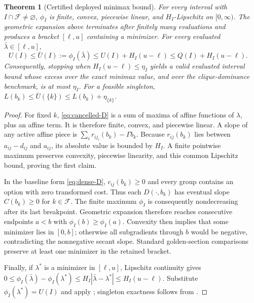 \documentclass[11pt]{article}
\theoremstyle{plain}
\newtheorem{theorem}{Theorem}
\theoremstyle{definition}
\theoremstyle{remark}
\begin{document}
\begin{theorem}[Certified deployed minimax bound]\label{thm:certified-minimax}
For every interval with $I\cap\mathcal F\ne\varnothing$, $\phi_I$ is finite, convex, piecewise linear, and $H_I$-Lipschitz on $[0,\infty)$.  The geometric expansion above terminates after finitely many evaluations and produces a bracket $[\ell,u]$ containing a minimizer.  For every evaluated $\bar\lambda\in[\ell,u]$,
\begin{equation}\label{eq:certified-gap}
U(I)\le \bar U(I):=\phi_I(\bar\lambda)
\le U(I)+H_I(u-\ell)\le Q(I)+H_I(u-\ell).
\end{equation}
Consequently, stopping when $H_I(u-\ell)\le\eta_I$ yields a valid evaluated interval bound whose excess over the exact minimax value, and over the clique-dominance benchmark, is at most $\eta_I$.  For a feasible singleton, $L(b_k)\le\bar U(\{k\})\le L(b_k)+\eta_{\{k\}}$.
\end{theorem}
\begin{proof}
For fixed $k$, \eqref{eq:cancelled-D} is a sum of maxima of affine functions of $\lambda$, plus an affine term.  It is therefore finite, convex, and piecewise linear.  A slope of any active affine piece is
$\sum_i r_{ij_i}(b_k)-\Gamma b_k$.  Because $r_{ij}(b_k)$ lies between $a_{ij}-d_{ij}$ and $a_{ij}$, its absolute value is bounded by $H_I$.  A finite pointwise maximum preserves convexity, piecewise linearity, and this common Lipschitz bound, proving the first claim.

In the baseline form \eqref{eq:dense-D}, $c_{ij}(b_k)\ge0$ and every group contains an option with zero transformed cost.  Thus each $D(\cdot,b_k)$ has eventual slope $C(b_k)\ge0$ for $k\in\mathcal F$.  The finite maximum $\phi_I$ is consequently nondecreasing after its last breakpoint.  Geometric expansion therefore reaches consecutive endpoints $a<b$ with $\phi_I(b)\ge\phi_I(a)$.  Convexity then implies that some minimizer lies in $[0,b]$; otherwise all subgradients through $b$ would be negative, contradicting the nonnegative secant slope.  Standard golden-section comparisons preserve at least one minimizer in the retained bracket.

Finally, if $\lambda^*$ is a minimizer in $[\ell,u]$, Lipschitz continuity gives
$0\le\phi_I(\bar\lambda)-\phi_I(\lambda^*)\le H_I|\bar\lambda-\lambda^*|\le H_I(u-\ell)$.
Substitute $\phi_I(\lambda^*)=U(I)$ and apply ; singleton exactness follows from .
\end{proof}
\end{document}
